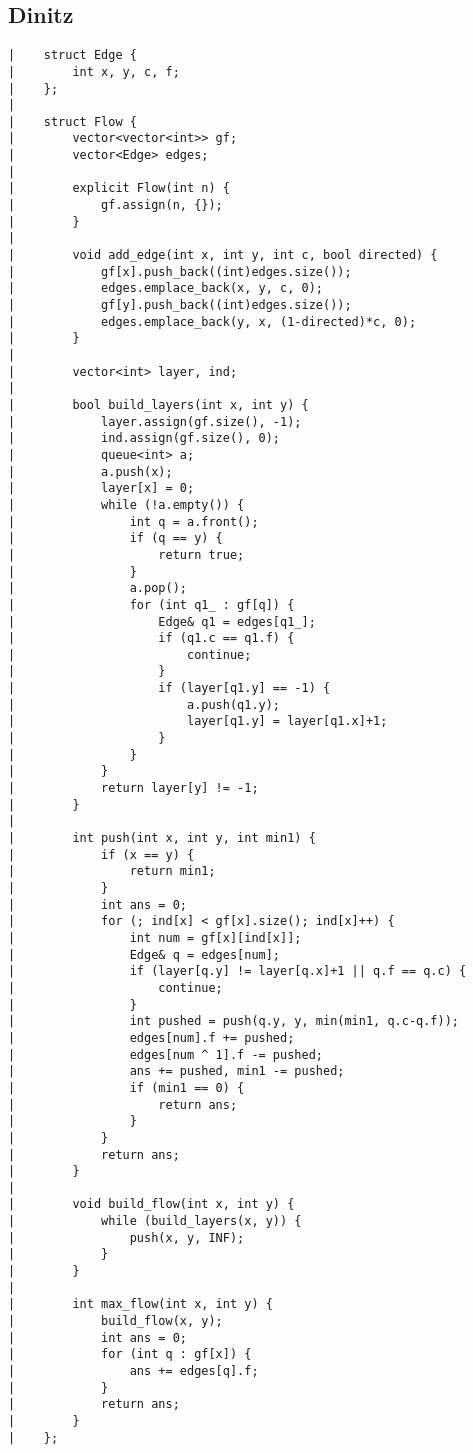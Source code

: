 \documentclass[a4paper, 10pt]{article}
\begin{document}
\begin{center}

\section*{Dinitz}
\begin{verbatim}
|    struct Edge {
|        int x, y, c, f;
|    };
|    
|    struct Flow {
|        vector<vector<int>> gf;
|        vector<Edge> edges;
|    
|        explicit Flow(int n) {
|            gf.assign(n, {});
|        }
|    
|        void add_edge(int x, int y, int c, bool directed) {
|            gf[x].push_back((int)edges.size());
|            edges.emplace_back(x, y, c, 0);
|            gf[y].push_back((int)edges.size());
|            edges.emplace_back(y, x, (1-directed)*c, 0);
|        }
|    
|        vector<int> layer, ind;
|    
|        bool build_layers(int x, int y) {
|            layer.assign(gf.size(), -1);
|            ind.assign(gf.size(), 0);
|            queue<int> a;
|            a.push(x);
|            layer[x] = 0;
|            while (!a.empty()) {
|                int q = a.front();
|                if (q == y) {
|                    return true;
|                }
|                a.pop();
|                for (int q1_ : gf[q]) {
|                    Edge& q1 = edges[q1_];
|                    if (q1.c == q1.f) {
|                        continue;
|                    }
|                    if (layer[q1.y] == -1) {
|                        a.push(q1.y);
|                        layer[q1.y] = layer[q1.x]+1;
|                    }
|                }
|            }
|            return layer[y] != -1;
|        }
|    
|        int push(int x, int y, int min1) {
|            if (x == y) {
|                return min1;
|            }
|            int ans = 0;
|            for (; ind[x] < gf[x].size(); ind[x]++) {
|                int num = gf[x][ind[x]];
|                Edge& q = edges[num];
|                if (layer[q.y] != layer[q.x]+1 || q.f == q.c) {
|                    continue;
|                }
|                int pushed = push(q.y, y, min(min1, q.c-q.f));
|                edges[num].f += pushed;
|                edges[num ^ 1].f -= pushed;
|                ans += pushed, min1 -= pushed;
|                if (min1 == 0) {
|                    return ans;
|                }
|            }
|            return ans;
|        }
|    
|        void build_flow(int x, int y) {
|            while (build_layers(x, y)) {
|                push(x, y, INF);
|            }
|        }
|    
|        int max_flow(int x, int y) {
|            build_flow(x, y);
|            int ans = 0;
|            for (int q : gf[x]) {
|                ans += edges[q].f;
|            }
|            return ans;
|        }
|    };
\end{verbatim}


\end{center}
\end{document}
